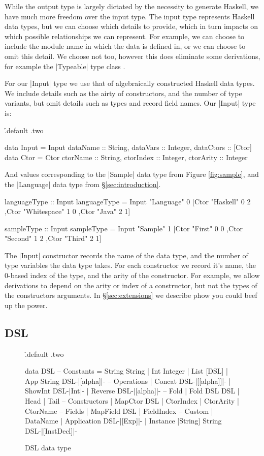 \documentclass[preprint]{sigplanconf}
\begin{document}
While the output type is largely dictated by the necessity to generate Haskell, we have much more freedom over the input type. The input type represents Haskell data types, but we can choose which details to provide, which in turn impacts on which possible relationships we can represent. For example, we can choose to include the module name in which the data is defined in, or we can choose to omit this detail. We choose not too, however this does eliminate some derivations, for example the |Typeable| type class \cite{lammel:syb}.

For our |Input| type we use that of algebraically constructed Haskell data types. We include details such as the airty of constructors, and the number of type variants, but omit details such as types and record field names. Our |Input| type is:

\h{.default .two}\begin{code}
data Input = Input {dataName :: String, dataVars :: Integer, dataCtors :: [Ctor]}
data Ctor = Ctor {ctorName :: String, ctorIndex :: Integer, ctorArity :: Integer}
\end{code}

And values corresponding to the |Sample| data type from Figure \ref{fig:sample}, and the |Language| data type from \S\ref{sec:introduction}.

\begin{code}
languageType :: Input
languageType = Input "Language" 0
    [Ctor "Haskell" 0 2
    ,Ctor "Whitespace" 1 0
    ,Ctor "Java" 2 1]

sampleType :: Input
sampleType = Input "Sample" 1
    [Ctor "First" 0 0
    ,Ctor "Second" 1 2
    ,Ctor "Third" 2 1]
\end{code}

The |Input| constructor records the name of the data type, and the number of type variables the data type takes. For each constructor we record it's name, the 0-based index of the type, and the arity of the constructor. For example, we allow derivations to depend on the arity or index of a constructor, but not the types of the constructors arguments. In \S\ref{sec:extensions} we describe phow you could beef up the power.

\subsection{DSL}

\begin{figure}
\h{.default .two}\begin{code}
data DSL
    -- Constants
    = String String
    | Int Integer
    | List [DSL]
    | App String DSL{-|[alpha]|-}
    -- Operations
    | Concat DSL{-|[[alpha]]|-}
    | ShowInt DSL{-|Int|-}
    | Reverse DSL{-|[alpha]|-}
    -- Fold
    | Fold DSL DSL
    | Head
    | Tail
    -- Constructors
    | MapCtor DSL
    | CtorIndex
    | CtorArity
    | CtorName
    -- Fields
    | MapField DSL
    | FieldIndex
    -- Custom
    | DataName
    | Application DSL{-|[Exp]|-}
    | Instance [String] String DSL{-|[InstDecl]|-}
\end{code}
\caption{DSL data type}
\label{fig:dsl}
\end{figure}
\end{document}
